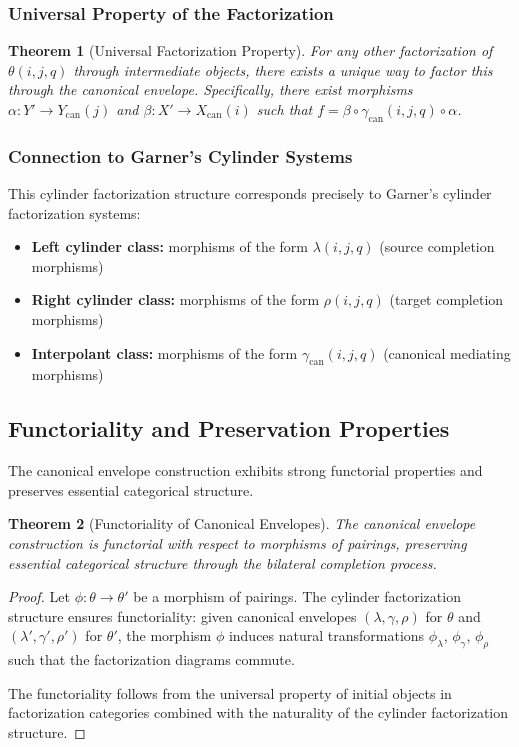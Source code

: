 \documentclass[11pt]{article}
\theoremstyle{plain}
\newtheorem{theorem}{Theorem}[section]
\theoremstyle{definition}
\theoremstyle{remark}
\begin{document}
\subsubsection{Universal Property of the Factorization}

\begin{theorem}[Universal Factorization Property]
For any other factorization of $\theta(i,j,q)$ through intermediate objects, there exists a unique way to factor this through the canonical envelope. Specifically, there exist morphisms $\alpha : Y' \to Y_{\mathrm{can}}(j)$ and $\beta : X' \to X_{\mathrm{can}}(i)$ such that $f = \beta \circ \gamma_{\mathrm{can}}(i,j,q) \circ \alpha$.
\end{theorem}

\subsubsection{Connection to Garner's Cylinder Systems}

This cylinder factorization structure corresponds precisely to Garner's cylinder factorization systems:
\begin{itemize}
\item \textbf{Left cylinder class:} morphisms of the form $\lambda(i,j,q)$ (source completion morphisms)
\item \textbf{Right cylinder class:} morphisms of the form $\rho(i,j,q)$ (target completion morphisms)  
\item \textbf{Interpolant class:} morphisms of the form $\gamma_{\mathrm{can}}(i,j,q)$ (canonical mediating morphisms)
\end{itemize}

\subsection{Functoriality and Preservation Properties}

The canonical envelope construction exhibits strong functorial properties and preserves essential categorical structure.

\begin{theorem}[Functoriality of Canonical Envelopes]
The canonical envelope construction is functorial with respect to morphisms of pairings, preserving essential categorical structure through the bilateral completion process.
\end{theorem}

\begin{proof}
Let $\phi : \theta \to \theta'$ be a morphism of pairings. The cylinder factorization structure ensures functoriality: given canonical envelopes $(\lambda, \gamma, \rho)$ for $\theta$ and $(\lambda', \gamma', \rho')$ for $\theta'$, the morphism $\phi$ induces natural transformations $\phi_\lambda$, $\phi_\gamma$, $\phi_\rho$ such that the factorization diagrams commute.

The functoriality follows from the universal property of initial objects in factorization categories combined with the naturality of the cylinder factorization structure.
\end{proof}
\end{document}
